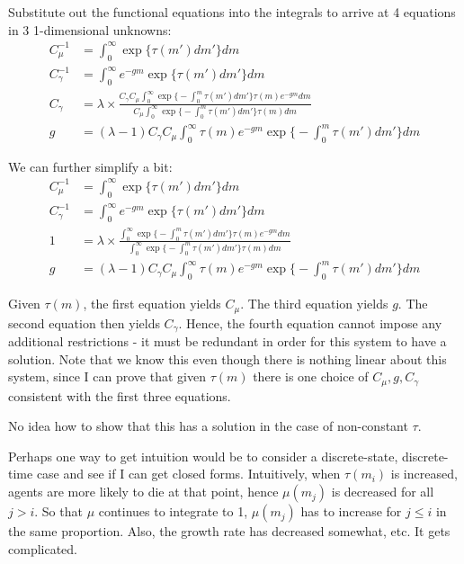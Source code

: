 \documentclass[12pt,english]{article}
\theoremstyle{remark}
\begin{document}
Substitute out the functional equations into the integrals to arrive at 4 equations in 3 1-dimensional unknowns:
\begin{align*}
	C_{\mu}^{-1} &= \int_{0}^{\infty} \exp \Big\{ \tau(m') dm'\Big\} dm \\
	C_{\gamma}^{-1} &= \int_{0}^{\infty} e^{-gm}  \exp \Big\{ \tau(m') dm'\Big\} dm \\
	C_{\gamma} &= \lambda \times  \frac{ C_{\gamma} C_{\mu} \int_{0}^{\infty} \exp \Big\{  -\int_{0}^{m} \tau(m') dm'\Big\}  \tau(m) e^{-gm} dm}{C_{\mu} \int_{0}^{\infty} \exp \Big\{  -\int_{0}^{m} \tau(m') dm'\Big\}  \tau(m) dm} \\
	g &= (\lambda -1) C_{\gamma} C_{\mu} \int_{0}^{\infty} \tau(m) e^{-gm} \exp \Big\{  -\int_{0}^{m} \tau(m') dm'\Big\}   dm
\end{align*}

We can further simplify a bit: 
\begin{align*}
C_{\mu}^{-1} &= \int_{0}^{\infty} \exp \Big\{ \tau(m') dm'\Big\} dm \\
C_{\gamma}^{-1} &= \int_{0}^{\infty} e^{-gm}  \exp \Big\{ \tau(m') dm'\Big\} dm \\
1 &= \lambda \times  \frac{ \int_{0}^{\infty} \exp \Big\{  -\int_{0}^{m} \tau(m') dm'\Big\}  \tau(m) e^{-gm} dm}{\int_{0}^{\infty} \exp \Big\{  -\int_{0}^{m} \tau(m') dm'\Big\}  \tau(m) dm} \\
g &= (\lambda -1) C_{\gamma} C_{\mu} \int_{0}^{\infty} \tau(m) e^{-gm} \exp \Big\{  -\int_{0}^{m} \tau(m') dm'\Big\}   dm
\end{align*}

Given $\tau(m)$, the first equation yields $C_{\mu}$. The third equation yields $g$. The second equation then yields $C_{\gamma}$. Hence, the fourth equation cannot impose any additional restrictions - it must be redundant in order for this system to have a solution. Note that we know this even though there is nothing linear about this system, since I can prove that given $\tau(m)$ there is one choice of $C_{\mu}, g, C_{\gamma}$ consistent with the first three equations. 


No idea how to show that this has a solution in the case of non-constant $\tau$. 

Perhaps one way to get intuition would be to consider a discrete-state, discrete-time case and see if I can get closed forms. Intuitively, when $\tau(m_i)$ is increased, agents are more likely to die at that point, hence $\mu(m_j)$ is decreased for all $j > i$. So that $\mu$ continues to integrate to 1, $\mu(m_j)$ has to increase for $j \le i$ in the same proportion. Also, the growth rate has decreased somewhat, etc. It gets complicated.
\end{document}
